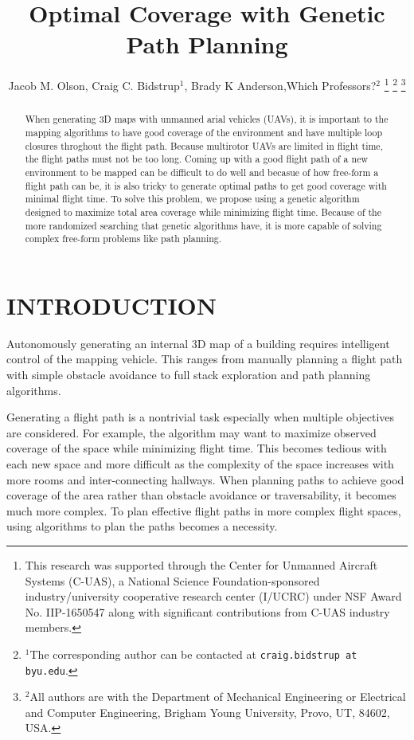 \documentclass[letterpaper, 10 pt, conference]{ieeeconf}  %
\title{\LARGE \bf
Optimal Coverage with Genetic Path Planning
}
\author{Jacob M. Olson, Craig C. Bidstrup$^{1}$, Brady K Anderson,Which Professors?$^{2}$%
\thanks{This research was supported through the Center for Unmanned Aircraft Systems (C-UAS), a National Science Foundation-sponsored industry/university
cooperative research center (I/UCRC) under NSF Award No. IIP-1650547
along with significant contributions from C-UAS industry members.}%
\thanks{$^{1}$The corresponding author can be contacted at
        {\tt\small craig.bidstrup at byu.edu}.}%
\thanks{$^{2}$All authors are with the Department of Mechanical Engineering or Electrical and Computer Engineering,
        Brigham Young University, Provo, UT, 84602, USA.}%
}
\begin{document}
\maketitle
\thispagestyle{empty}
\pagestyle{empty}


\begin{abstract}

When generating 3D maps with unmanned arial vehicles (UAVs), it is important to the mapping algorithms to have good coverage of the environment and have multiple loop closures throghout the flight path. Because multirotor UAVs are limited in flight time, the flight paths must not be too long. Coming up with a good flight path of a new environment to be mapped can be difficult to do well and becasue of how free-form a flight path can be, it is also tricky to generate optimal paths to get good coverage with minimal flight time.
To solve this problem, we propose using a genetic algorithm designed to maximize total area coverage while minimizing flight time. Because of the more randomized searching that genetic algorithms have, it is more capable of solving complex free-form problems like path planning.

\end{abstract}


\section{INTRODUCTION}


Autonomously generating an internal 3D map of a building requires intelligent control of the mapping vehicle. This ranges from manually planning a flight path with simple obstacle avoidance to full stack exploration and path planning algorithms.

Generating a flight path is a nontrivial task especially when multiple objectives are considered. For example, the algorithm may want to maximize observed coverage of the space while minimizing flight time. This becomes tedious with each new space and more difficult as the complexity of the space increases with more rooms and inter-connecting hallways. When planning paths to achieve good coverage of the area rather than obstacle avoidance or traversability, it becomes much more complex. To plan effective flight paths in more complex flight spaces, using algorithms to plan the paths becomes a necessity.
\end{document}
